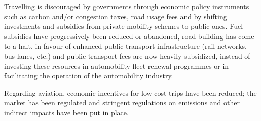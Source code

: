 

Travelling is discouraged by governments through economic policy instruments such as carbon and/or congestion taxes, road usage fees and by shifting investments and subsidies from private mobility schemes to public ones. Fuel subsidies have progressively been reduced or abandoned, road building has come to a halt, in favour of enhanced public transport infrastructure (rail networks, bus lanes, etc.) and public transport fees are now heavily subsidized, instead of investing these resources in automobility fleet renewal programmes or in facilitating the operation of the automobility industry.

Regarding aviation, economic incentives for low-cost trips have been reduced; the market has been regulated and stringent regulations on emissions and other indirect impacts have been put in place.